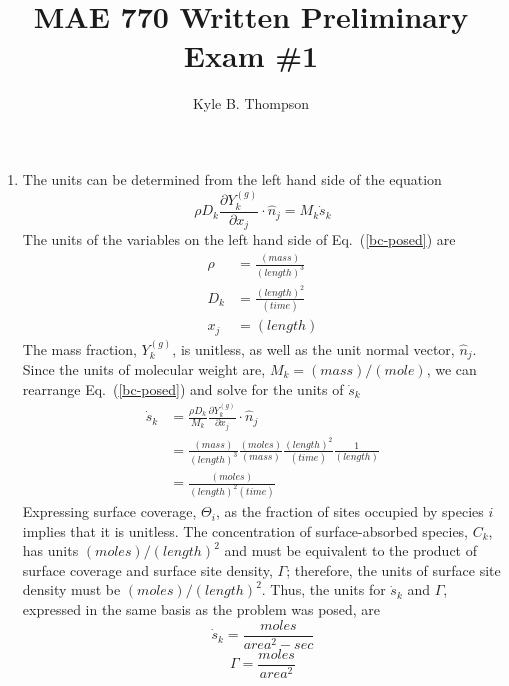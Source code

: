 \documentclass{report}
\title{MAE 770 Written Preliminary Exam \#1}
\author{ Kyle B. Thompson }
\newcommand{\eref}[1]{Eq.~(\ref{#1})}
\newcommand{\sk}{\dot{s}_k}
\begin{document}
\maketitle



\begin{enumerate}[label=(\alph*)]
  \item The units can be determined from the left hand side of the equation
    \begin{equation}
      \rho D_k \frac{\partial Y_k^{(g)}}{\partial x_j} \cdot \hat{n}_j = M_k \sk
      \label{bc-posed}
    \end{equation}
  The units of the variables on the left hand side of \eref{bc-posed} are
  \begin{align*}
    \rho &= \frac{(mass)}{(length)^3} \\
    D_k &= \frac{(length)^2}{(time)} \\
    x_j &= (length)
  \end{align*}
  The mass fraction, $Y_k^{(g)}$, is unitless, as well as the unit normal vector,
  $\hat{n}_j$. Since the units of molecular weight are, $M_k = (mass)/(mole)$, we can
  rearrange \eref{bc-posed} and solve for the units of $\sk$
  \begin{equation}
    \label{units sdot}
    \begin{aligned}
      \sk &= \frac{\rho D_k}{M_k}\frac{\partial Y_k^{(g)}}{\partial x_j}\cdot \hat{n}_j \\
      &= \frac{(mass)}{(length)^3} \frac{(moles)}{(mass)} \frac{(length)^2}{(time)}\frac{1}{(length)} \\
      &= \frac{(moles)}{(length)^2 (time)}
    \end{aligned}
  \end{equation}
  Expressing surface coverage, $\Theta_i$, as the fraction of sites occupied by
  species $i$ implies that it is unitless.  The concentration of
  surface-absorbed species, $C_k$, has units $(moles)/(length)^2$ and must be equivalent to
  the product of surface coverage and surface site density, $\Gamma$; therefore,
  the units of surface site density must be $(moles)/(length)^2$.  Thus, the units for $\sk$
  and $\Gamma$, expressed in the same basis as the problem was posed, are
  \[
    \boxed{\sk = \frac{moles}{area^2-sec}}
  \]
  \[
    \boxed{\Gamma = \frac{moles}{area^2}}
  \]


\end{enumerate}
\end{document}
